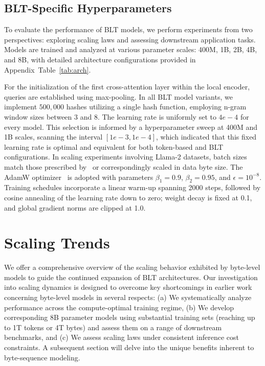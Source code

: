 \subsection{{\textsc BLT}-Specific Hyperparameters} To evaluate the performance of {\textsc BLT} models, we perform experiments from two perspectives: exploring scaling laws and assessing downstream application tasks. Models are trained and analyzed at various parameter scales: 400M, 1B, 2B, 4B, and 8B, with detailed architecture configurations provided in Appendix~Table~\ref{tab:arch}.

For the initialization of the first cross-attention layer within the local encoder, queries are established using max-pooling. In all {\textsc BLT} model variants, we implement $500,000$ hashes utilizing a single hash function, employing n-gram window sizes between 3 and 8. The learning rate is uniformly set to $4e-4$ for every model. This selection is informed by a hyperparameter sweep at 400M and 1B scales, scanning the interval $[1e-3, 1e-4]$, which indicated that this fixed learning rate is optimal and equivalent for both token-based and {\textsc BLT} configurations. In scaling experiments involving Llama-2 datasets, batch sizes match those prescribed by~\cite{dubey2024llama} or correspondingly scaled in data byte size. The AdamW optimizer~\citep{adamw} is adopted with parameters $\beta_1 = 0.9$, $\beta_2 = 0.95$, and $\epsilon=10^{-8}$. Training schedules incorporate a linear warm-up spanning 2000 steps, followed by cosine annealing of the learning rate down to zero; weight decay is fixed at 0.1, and global gradient norms are clipped at 1.0.

\section{Scaling Trends}
\label{section:scaling}

We offer a comprehensive overview of the scaling behavior exhibited by byte-level models to guide the continued expansion of {\textsc BLT} architectures. Our investigation into scaling dynamics is designed to overcome key shortcomings in earlier work concerning byte-level models in several respects: (a) We systematically analyze performance across the compute-optimal training regime, (b) We develop corresponding 8B parameter models using substantial training sets (reaching up to 1T tokens or 4T bytes) and assess them on a range of downstream benchmarks, and (c) We assess scaling laws under consistent inference cost constraints. A subsequent section will delve into the unique benefits inherent to byte-sequence modeling.

